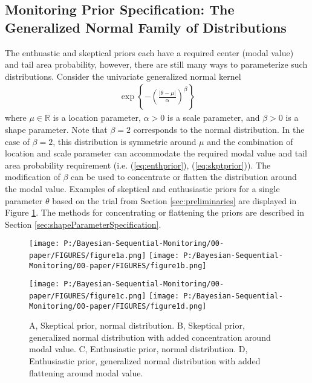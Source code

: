 \documentclass[12pt]{article}
\begin{document}
\subsection{Monitoring Prior Specification: The Generalized Normal Family of Distributions}
The enthuastic and skeptical priors each have a required center (modal value) and tail area probability, however, there are still many ways to parameterize such distributions. Consider the univariate generalized normal kernel 
\begin{align}
\exp\left\{-\left(\frac{|\theta-\mu|}{\alpha}\right)^\beta\right\}
\end{align} where $\mu\in\mathbb{R}$ is a location parameter, $\alpha>0$ is a scale parameter, and $\beta>0$ is a shape parameter. Note that $\beta=2$ corresponds to the normal distribution. In the case of $\beta=2$, this distribution is symmetric around $\mu$ and the combination of location and scale parameter can accommodate the required modal value and tail area probability requirement (i.e. (\ref{eq:enthprior}), (\ref{eq:skptprior})). The modification of $\beta$ can be used to concentrate or flatten the distribution around the modal value. Examples of skeptical and enthusiastic priors for a single parameter $\theta$ based on the trial from Section \ref{sec:preliminaries} are displayed in Figure \ref{fig:figure1}. The methods for concentrating or flattening the priors are described in Section \ref{sec:shapeParameterSpecification}.

%

\begin{figure}
\texttt{[image: P:/Bayesian-Sequential-Monitoring/00-paper/FIGURES/figure1a.png]}
\texttt{[image: P:/Bayesian-Sequential-Monitoring/00-paper/FIGURES/figure1b.png]}

\texttt{[image: P:/Bayesian-Sequential-Monitoring/00-paper/FIGURES/figure1c.png]}
\texttt{[image: P:/Bayesian-Sequential-Monitoring/00-paper/FIGURES/figure1d.png]}

\caption{A, Skeptical prior, normal distribution. B, Skeptical prior, generalized normal distribution with added concentration around modal value. C, Enthusiastic prior, normal distribution. D, Enthusiastic prior, generalized normal distribution with added flattening around modal value.}
\label{fig:figure1}
\end{figure}
\end{document}
